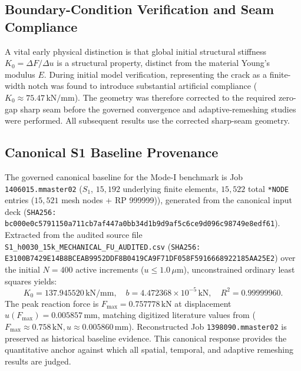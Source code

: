 \subsection{Boundary-Condition Verification and Seam Compliance}
A vital early physical distinction is that global initial structural stiffness $K_0 = \Delta F / \Delta u$ is a structural property, distinct from the material Young's modulus $E$. During initial model verification, representing the crack as a finite-width notch was found to introduce substantial artificial compliance ($K_0 \approx 75.47\,\mathrm{kN/mm}$). The geometry was therefore corrected to the required zero-gap sharp seam before the governed convergence and adaptive-remeshing studies were performed. All subsequent results use the corrected sharp-seam geometry.

\subsection{Canonical S1 Baseline Provenance}
\begingroup\small
The governed canonical baseline for the Mode-I benchmark is Job \texttt{1406015.mmaster02} ($S_1$, $15{,}192$ underlying finite elements, $15{,}522$ total \texttt{*NODE} entries ($15{,}521$ mesh nodes + RP 999999)), generated from the canonical input deck (\texttt{SHA256: bc000e0c5791150a\allowbreak711cb7af447a0bb3\allowbreak4d1b9d9af5c6ce9d\allowbreak096c98749e8edf61}). Extracted from the audited source file \nolinkurl{S1_h0030_15k_MECHANICAL_FU_AUDITED.csv} (\texttt{SHA256: E3100B7429E14B8B\allowbreak CEAB9952DDF8B041\allowbreak 9CA9F71DF058F591\allowbreak 6668922185AA25E2}) over the initial $N = 400$ active increments ($u \le 1.0\,\mu\mathrm{m}$), unconstrained ordinary least squares yields:
\begin{equation}
  \boxed{K_0 = 137.945520\,\mathrm{kN/mm}}, \quad b = 4.472368 \times 10^{-5}\,\mathrm{kN}, \quad R^2 = 0.99999960.
\end{equation}
The peak reaction force is $F_{\max} = 0.757778\,\mathrm{kN}$ at displacement $u(F_{\max}) = 0.005857\,\mathrm{mm}$, matching digitized literature values from \citet{pandey2025} ($F_{\max} \approx 0.758\,\mathrm{kN}, u \approx 0.005860\,\mathrm{mm}$). Reconstructed Job \texttt{1398090.mmaster02} is preserved as historical baseline evidence. This canonical response provides the quantitative anchor against which all spatial, temporal, and adaptive remeshing results are judged.
\par\endgroup
